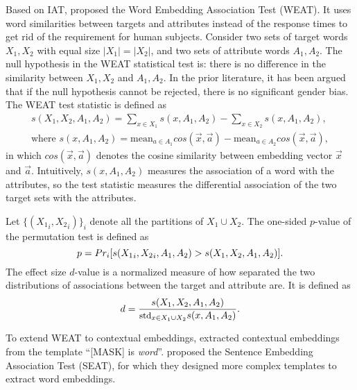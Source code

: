 Based on IAT,  proposed the
Word Embedding Association Test (WEAT). It uses word
similarities between targets and attributes instead of the
response times to get rid of the requirement for human
subjects. Consider two sets of target words $X_1,X_2$ with
equal size $|X_1|=|X_2|$, and two sets of attribute words
$A_1,A_2$. The null hypothesis in the WEAT statistical test
is: there is no difference in the similarity between
$X_1,X_2$ and $A_1,A_2$. In the prior literature, it has
been argued that if the null hypothesis cannot be rejected,
there is no significant gender bias.  The WEAT test
statistic is defined as
\begin{gather*}
s(X_1,X_2,A_1,A_2)=\sum_{x\in X_1}s(x,A_1,A_2)-\sum_{x\in X_2}s(x,A_1,A_2),\\
\mbox{where } s(x,A_1,A_2)=\mbox{mean}_{a\in A_1}cos(\vec{x},\vec{a})-\mbox{mean}_{a\in A_2}cos(\vec{x},\vec{a}),
\end{gather*}
in which $cos(\vec{x},\vec{a})$ denotes the cosine similarity between embedding vector $\vec{x}$ and $\vec{a}$. Intuitively, $s(x,A_1,A_2)$ measures the association of a word with the attributes, so the test statistic measures the differential association of the two target sets with the attributes. 

Let $\{({X_1}_i,{X_2}_i)\}_{i}$ denote all the partitions of $X_1\cup X_2$. The one-sided $p$-value of the permutation test is defined as $$\small
p=Pr_i[s({X_1}_i,{X_2}_i,A_1,A_2)>s(X_1,X_2,A_1,A_2)].$$
The effect size $d$-value is a normalized measure of how separated the two distributions of associations between the target and attribute are. It is defined as
\begin{eqnarray}
\small
d=\frac{s(X_1,X_2,A_1,A_2)}{\mbox{std}_{x\in X_1 \cup X_2}s(x,A_1,A_2)}.\nonumber
\end{eqnarray}

To extend WEAT to contextual embeddings,
 extracted contextual embeddings
from the template ``[MASK] is \textit{word}''.
 proposed the Sentence Embedding
Association Test (SEAT), for which they designed more complex templates to extract word embeddings. 

